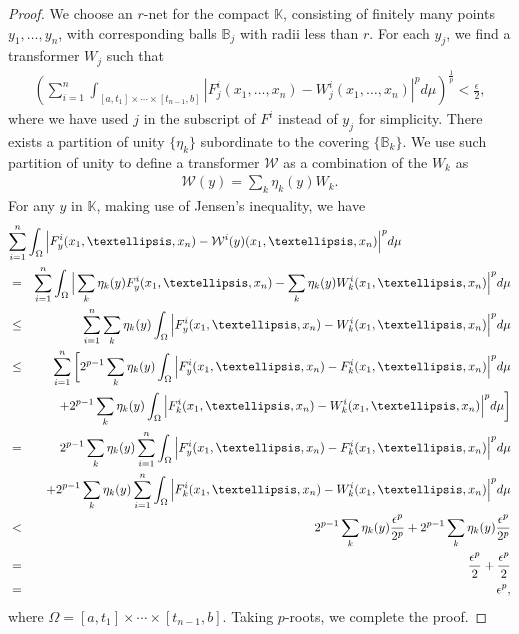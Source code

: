 \documentclass[a4paper,12pt,reqno]{amsart}
\theoremstyle{definition}
\theoremstyle{remark}
\begin{document}
\begin{proof}
    We choose an $r$-net for the compact $\mathbb K$, consisting of finitely many points $y_1, \ldots , y_n$, with corresponding balls $\mathbb B_j$ with radii less than $r$. For each $y_j$, we find a transformer $W_j$ such that   
    \begin{eqnarray*}
        \left (\sum_{i=1}^n \int_{[a,t_1]\times \cdots \times [t_{n-1},b]}|F^i_j(x_1,\ldots,x_n)- W^i_j(x_1,\ldots,x_n)|^pd\mu\right )^\frac{1}{p} < \frac{\epsilon}{2},
    \end{eqnarray*}
    where we have used $j$ in the subscript of $F^i$ instead of $y_j$ for simplicity. 
    There exists a partition of unity $\{\eta_k\}$ subordinate to the covering $\{\mathbb B_k\}$. We use such partition of unity to define a transformer $\mathcal W$ as a combination of the $W_k$ as
    \begin{eqnarray*}
         \mathcal W(y) = \sum_k \eta_k(y) W_k.
    \end{eqnarray*}
    For any $y$ in $\mathbb K$, making use of Jensen's inequality, we have
    \begin{eqnarray*}
           \lefteqn{\sum_{i=1}^n \int_{\Omega}\Big|F^i_y(x_1,\ldots,x_n)- \mathcal W^i(y)(x_1,\ldots,x_n)\Big|^pd\mu}\\
           &=& \sum_{i=1}^n \int_{\Omega} \Big|\sum_k \eta_k(y)F^i_y(x_1,\ldots,x_n) - \sum_k \eta_k(y) W^i_k(x_1,\ldots,x_n)\Big|^pd\mu\\
           &\leq& \sum_{i=1}^n\sum_k\eta_k(y) \int_{\Omega}\Big|F^i_y(x_1,\ldots,x_n)-W^i_k(x_1,\ldots,x_n)\Big|^pd\mu\\
           &\leq& \sum_{i=1}^n\bigg[2^{p-1}\sum_k \eta_k(y) \int_{\Omega}\Big|F^i_y(x_1,\ldots,x_n)-F^i_k(x_1,\ldots,x_n)\Big|^pd\mu\\
           && + 2^{p-1}\sum_k \eta_k(y)\int_{\Omega} \Big|F^i_k(x_1,\ldots,x_n) - W^i_k(x_1,\ldots,x_n)\Big|^pd\mu\bigg]\\
           &=& 2^{p-1}\sum_k\eta_k(y)\sum_{i=1}^n\int_{\Omega}\Big|F^i_y(x_1,\ldots,x_n)-F^i_k(x_1,\ldots,x_n)\Big|^pd\mu\\
           &&   + 2^{p-1}\sum_k\eta_k(y)\sum_{i=1}^n\int_{\Omega}\Big|F^i_k(x_1,\ldots,x_n)-W_k^i(x_1,\ldots,x_n)\Big|^pd\mu\\
           &<& 2^{p-1}\sum_k\eta_k(y)\frac{\epsilon^p}{2^p} + 2^{p-1}\sum_k\eta_k(y)\frac{\epsilon^p}{2^p}\\
           &=&\frac{\epsilon^p}{2} + \frac{\epsilon^p}{2}\\
           &=& \epsilon^p, 
    \end{eqnarray*}  
 where $\Omega =[a,t_1]\times \cdots \times [t_{n-1},b]$. Taking $p$-roots, we complete the proof.
\end{proof}
\end{document}
